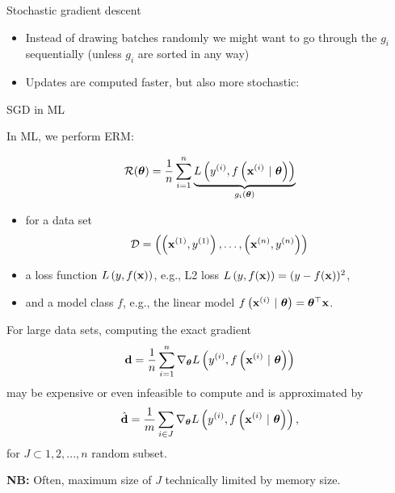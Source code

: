 \documentclass[11pt,compress,t,notes=noshow, xcolor=table]{beamer}
\begin{document}
\begin{vbframe}{Stochastic gradient descent}
\begin{itemize}
    \footnotesize
    \item Instead of drawing batches randomly we might want to go through the $g_i$ sequentially (unless $g_i$ are sorted in any way)
    \item Updates are computed faster, but also more stochastic: 
    \begin{itemize} 
    \end{itemize} 
\end{itemize}

\end{vbframe}

\begin{vbframe}{SGD in ML}

In ML, we perform ERM:  

$$
    \mathcal{R}(\bm{\theta}) = \frac{1}{n}\sum\limits_{i=1}^n \underbrace{L\left(y^{(i)}, f\left(\mathbf{x}^{(i)} ~|~ \bm{\theta}\right)\right)}_{g_i(\bm{\theta})}
$$

\begin{itemize}
    \item for a data set 
    $$\mathcal{D} = \left( \left(\mathbf{x}^{(1)}, y^{(1)}\right), \ldots, \left(\mathbf{x}^{(n)}, y^{(n)}\right)\right)$$
    \item a loss function $L\left(y, f(\mathbf{x})\right)$, e.g., L2 loss $L\left(y, f(\mathbf{x})\right) = (y - f(\mathbf{x}))^2$,
    \item and a model class $f$, e.g., the linear model $f\left(\mathbf{x}^{(i)} ~|~ \bm{\theta}\right) = \bm{\theta}^\top \mathbf{x}$. 
\end{itemize}

\framebreak 

For large data sets, computing the exact gradient 
$$
    \mathbf{d} = \frac{1}{n}\sum_{i=1}^n \nabla_{\thetav} \Lxyit %
$$ 
may be expensive or even infeasible to compute and is approximated by 
$$
\hat{\mathbf{d}} = \frac{1}{m}\sum_{i \in J} \nabla_{\bm{\theta}} L\left(y^{(i)}, f\left(\mathbf{x}^{(i)} ~|~ \bm{\theta}\right)\right),
$$
    for $J \subset{1, 2, ..., n}$ random subset. 

    \lz 
    
\textbf{NB:} Often, maximum size of $J$ technically limited by memory size.
\end{vbframe}
\end{document}
